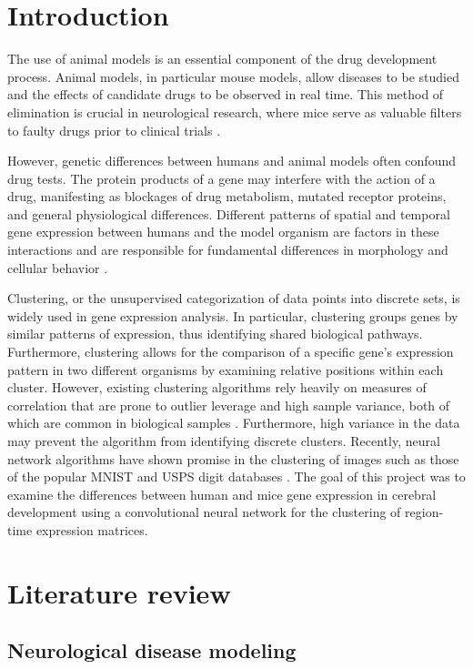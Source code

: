 \documentclass[12pt,oneside,onecolumn,a4paper]{article}
\begin{document}
\section{Introduction}

The use of animal models is an essential component of the drug development process. Animal models, in particular mouse models, allow diseases to be studied and the effects of candidate drugs to be observed in real time. This method of elimination is crucial in neurological research, where mice serve as valuable filters to faulty drugs prior to clinical trials \citep{Lin_2014}.

However, genetic differences between humans and animal models often confound drug tests. The protein products of a gene may interfere with the action of a drug, manifesting as blockages of drug metabolism, mutated receptor proteins, and general physiological differences. Different patterns of spatial and temporal gene expression between humans and the model organism are factors in these interactions and are responsible for fundamental differences in morphology and cellular behavior \citep{Burns_2015}.

Clustering, or the unsupervised categorization of data points into discrete sets, is widely used in gene expression analysis. In particular, clustering groups genes by similar patterns of expression, thus identifying shared biological pathways. Furthermore, clustering allows for the comparison of a specific gene's expression pattern in two different organisms by examining relative positions within each cluster. However, existing clustering algorithms rely heavily on measures of correlation that are prone to outlier leverage and high sample variance, both of which are common in biological samples \citep{how_expression_works}. Furthermore, high variance in the data may prevent the algorithm from identifying discrete clusters. Recently, neural network algorithms have shown promise in the clustering of images such as those of the popular MNIST and USPS digit databases \citep{Krizhevsky2012ImageNetCW}. The goal of this project was to examine the differences between human and mice gene expression in cerebral development using a convolutional neural network for the clustering of region-time expression matrices. 

\section{Literature review}

\subsection{Neurological disease modeling}
\end{document}
